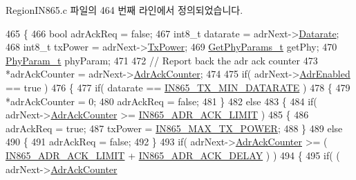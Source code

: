 Region\+I\+N865.\+c 파일의 464 번째 라인에서 정의되었습니다.


\begin{DoxyCode}
465 \{
466     \textcolor{keywordtype}{bool} adrAckReq = \textcolor{keyword}{false};
467     int8\_t datarate = adrNext->\mbox{\hyperlink{structs_adr_next_params_ae2f6080f3aa0e9485c55513ca56bb24d}{Datarate}};
468     int8\_t txPower = adrNext->\mbox{\hyperlink{structs_adr_next_params_a037b4f849fa8ed4aa1d3c58aef2b28ec}{TxPower}};
469     \mbox{\hyperlink{structs_get_phy_params}{GetPhyParams\_t}} getPhy;
470     \mbox{\hyperlink{unionu_phy_param}{PhyParam\_t}} phyParam;
471 
472     \textcolor{comment}{// Report back the adr ack counter}
473     *adrAckCounter = adrNext->\mbox{\hyperlink{structs_adr_next_params_a24f0356a3491bf07be9ac99ffa33896a}{AdrAckCounter}};
474 
475     \textcolor{keywordflow}{if}( adrNext->\mbox{\hyperlink{structs_adr_next_params_ab3e2fb44577c95786e11aacd56769703}{AdrEnabled}} == \textcolor{keyword}{true} )
476     \{
477         \textcolor{keywordflow}{if}( datarate == \mbox{\hyperlink{group___r_e_g_i_o_n_i_n865_ga334bf7f8b226ad91762f977490af0c72}{IN865\_TX\_MIN\_DATARATE}} )
478         \{
479             *adrAckCounter = 0;
480             adrAckReq = \textcolor{keyword}{false};
481         \}
482         \textcolor{keywordflow}{else}
483         \{
484             \textcolor{keywordflow}{if}( adrNext->\mbox{\hyperlink{structs_adr_next_params_a24f0356a3491bf07be9ac99ffa33896a}{AdrAckCounter}} >= \mbox{\hyperlink{group___r_e_g_i_o_n_i_n865_ga7ac52736577da9a1671230aad8390229}{IN865\_ADR\_ACK\_LIMIT}} )
485             \{
486                 adrAckReq = \textcolor{keyword}{true};
487                 txPower = \mbox{\hyperlink{group___r_e_g_i_o_n_i_n865_ga6bd515d7c4fbad47210702da1d9396a3}{IN865\_MAX\_TX\_POWER}};
488             \}
489             \textcolor{keywordflow}{else}
490             \{
491                 adrAckReq = \textcolor{keyword}{false};
492             \}
493             \textcolor{keywordflow}{if}( adrNext->\mbox{\hyperlink{structs_adr_next_params_a24f0356a3491bf07be9ac99ffa33896a}{AdrAckCounter}} >= ( \mbox{\hyperlink{group___r_e_g_i_o_n_i_n865_ga7ac52736577da9a1671230aad8390229}{IN865\_ADR\_ACK\_LIMIT}} + 
      \mbox{\hyperlink{group___r_e_g_i_o_n_i_n865_ga54e9b88a690a69b222c4a3af1bd3d825}{IN865\_ADR\_ACK\_DELAY}} ) )
494             \{
495                 \textcolor{keywordflow}{if}( ( adrNext->\mbox{\hyperlink{structs_adr_next_params_a24f0356a3491bf07be9ac99ffa33896a}{AdrAckCounter}} %

\end{DoxyCode}
